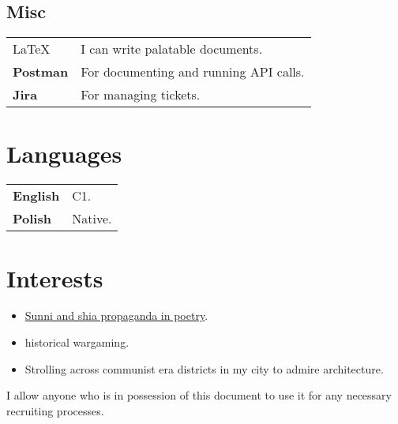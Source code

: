 \documentclass[10pt]{article}
\begin{document}
\subsection{Misc}
\begin{table}[H]
        \begin{tabularx}{\textwidth}{@{}l X}
         \LaTeX & I can write palatable documents. \\
         \textbf{Postman} & For documenting and running API calls.  \\
         \textbf{Jira} & For managing tickets.  \\
\end{tabularx}
\end{table}
\section{Languages}
\begin{table}[H]
        \begin{tabularx}{\textwidth}{@{}l X}
         \bfseries English & C1. \\
         \bfseries Polish & Native.  \\
\end{tabularx}
\end{table}
\section{Interests}
\begin{itemize}
    \item \href{http://cejsh.icm.edu.pl/cejsh/element/bwmeta1.element.desklight-b5b6fec4-8161-42ac-9a31-c0e6c344f9fa}{Sunni and shia propaganda in poetry}.
    \item historical wargaming.
    \item Strolling across communist era districts in my city to admire architecture.
\end{itemize}
\vfill
\begin{center}
I allow anyone who is in possession of this document to use it for any necessary recruiting processes.
\end{center}
\end{document}
